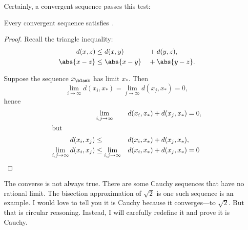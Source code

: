\documentclass{scrartcl}
\newcommand{\dist}{d}
\begin{document}
Certainly, a convergent sequence passes this test:
\begin{theorem}
  Every convergent sequence satisfies .
\end{theorem}
\begin{proof}
  Recall the triangle inequality:
  \begin{alignat*}{3}
    \dist(x,z)&\leq d(x,y)&&+d(y,z),\\
    \abs{x-z}&\leq \abs{x-y}&&+\abs{y-z}.
  \end{alignat*}

  Suppose the sequence \(x_{\blank}\) has limit \(x_{*}\). Then
  \[
    \lim_{i\to\infty} \dist(x_{i},x_*) = \lim_{j\to\infty} \dist(x_{j},x_{*})=0,
  \]
  hence
  \begin{alignat*}{3}
    &\lim_{i,j\to\infty}&&\dist(x_{i},x_{*})+\dist(x_{j},x_{*}) = 0, \\
    \shortintertext{but}
    \dist(x_{i},x_{j}) &\leq &&\dist(x_{i},x_{*}) + \dist(x_{j},x_{*}), \\
    \lim_{i,j\to \infty} \dist(x_{i},x_{j}) &\leq \lim_{i,j\to \infty} &&\dist(x_{i},x_{*})+\dist(x_{j},x_{*}) = 0
  \end{alignat*}
\end{proof}
The converse is not always true. There are some Cauchy sequences that have no rational limit. The bisection approximation of \(\sqrt 2\) is one such sequence is an example. I would love to tell you it is Cauchy because it converges---to \(\sqrt 2\). But that is circular reasoning. Instead, I will carefully redefine it and prove it is Cauchy.
\end{document}
